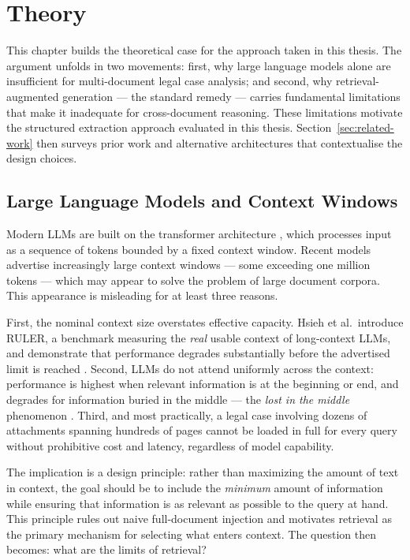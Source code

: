 \chapter{Theory}

This chapter builds the theoretical case for the approach taken in this thesis.
The argument unfolds in two movements: first, why large language models alone are
insufficient for multi-document legal case analysis; and second, why retrieval-augmented
generation --- the standard remedy --- carries fundamental limitations that make it
inadequate for cross-document reasoning. These limitations motivate the structured
extraction approach evaluated in this thesis. Section~\ref{sec:related-work} then
surveys prior work and alternative architectures that contextualise the design choices.

\section{Large Language Models and Context Windows}
\label{sec:llm-context}

Modern LLMs are built on the transformer architecture \cite{vaswani2023attentionneed},
which processes input as a sequence of tokens bounded by a fixed context window.
Recent models advertise increasingly large context windows --- some exceeding one
million tokens --- which may appear to solve the problem of large document corpora.
This appearance is misleading for at least three reasons.

First, the nominal context size overstates effective capacity. Hsieh et al.\ introduce
RULER, a benchmark measuring the \textit{real} usable context of long-context LLMs,
and demonstrate that performance degrades substantially before the advertised limit is
reached \cite{hsieh2024ruler}. Second, LLMs do not attend uniformly across the context:
performance is highest when relevant information is at the beginning or end, and
degrades for information buried in the middle --- the \textit{lost in the middle}
phenomenon \cite{liu2023lostmiddlelanguagemodels}. Third, and most practically, a
legal case involving dozens of attachments spanning hundreds of pages cannot be loaded
in full for every query without prohibitive cost and latency, regardless of model
capability.

The implication is a design principle: rather than maximizing the amount of text in
context, the goal should be to include the \emph{minimum} amount of information while
ensuring that information is as relevant as possible to the query at hand. This principle
rules out naive full-document injection and motivates retrieval as the primary mechanism
for selecting what enters context. The question then becomes: what are the limits of
retrieval?

